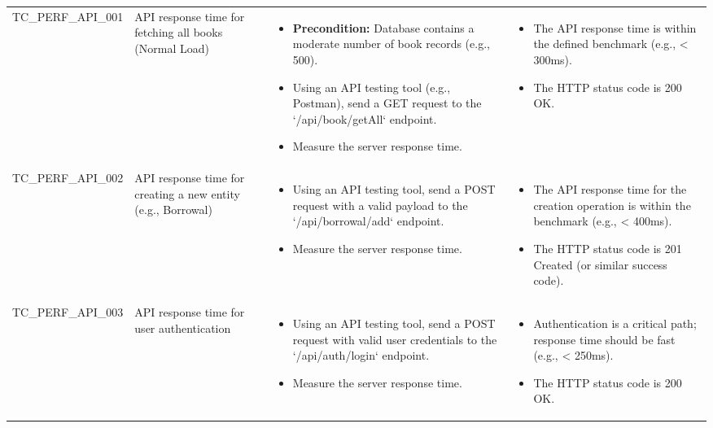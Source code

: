 \documentclass[10pt, a4paper]{report}
\begin{document}
\begin{longtable}{|>{\raggedright\arraybackslash}p{3.5cm}|>{\raggedright\arraybackslash}p{4cm}|>{\raggedright\arraybackslash}p{5cm}|>{\raggedright\arraybackslash}p{5.5cm}|}
\multicolumn{4}{|l|}{\textbf{Sub-Section: API Response Time Testing}} \\ \hline
TC\_PERF\_API\_001 & API response time for fetching all books (Normal Load) & 
    \begin{itemize}[noitemsep, topsep=0pt, partopsep=0pt, leftmargin=*]
        \item \textbf{Precondition:} Database contains a moderate number of book records (e.g., 500).
        \item Using an API testing tool (e.g., Postman), send a GET request to the `/api/book/getAll` endpoint.
        \item Measure the server response time.
    \end{itemize} & 
    \begin{itemize}[noitemsep, topsep=0pt, partopsep=0pt, leftmargin=*]
        \item The API response time is within the defined benchmark (e.g., < 300ms).
        \item The HTTP status code is 200 OK.
    \end{itemize} \\ \hline
TC\_PERF\_API\_002 & API response time for creating a new entity (e.g., Borrowal) & 
    \begin{itemize}[noitemsep, topsep=0pt, partopsep=0pt, leftmargin=*]
        \item Using an API testing tool, send a POST request with a valid payload to the `/api/borrowal/add` endpoint.
        \item Measure the server response time.
    \end{itemize} & 
    \begin{itemize}[noitemsep, topsep=0pt, partopsep=0pt, leftmargin=*]
        \item The API response time for the creation operation is within the benchmark (e.g., < 400ms).
        \item The HTTP status code is 201 Created (or similar success code).
    \end{itemize} \\ \hline
TC\_PERF\_API\_003 & API response time for user authentication & 
    \begin{itemize}[noitemsep, topsep=0pt, partopsep=0pt, leftmargin=*]
        \item Using an API testing tool, send a POST request with valid user credentials to the `/api/auth/login` endpoint.
        \item Measure the server response time.
    \end{itemize} & 
    \begin{itemize}[noitemsep, topsep=0pt, partopsep=0pt, leftmargin=*]
        \item Authentication is a critical path; response time should be fast (e.g., < 250ms).
        \item The HTTP status code is 200 OK.
    \end{itemize} \\ \hline


\end{longtable}
\end{document}
